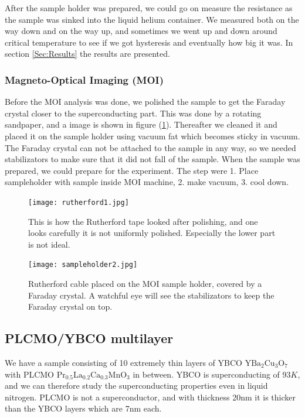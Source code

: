 \documentclass{comjnl}
\newcommand*\chem[1]{\ensuremath{\mathrm{#1}}}
\begin{document}
After the sample holder was prepared, we could go on measure the resistance as the sample was sinked into the liquid helium container. We measured both on the way down and on the way up, and sometimes we went up and down around critical temperature to see if we got hysteresis and eventually how big it was. In section \ref{Sec:Results} the results are presented.

\subsubsection{Magneto-Optical Imaging (MOI)}
Before the MOI analysis was done, we polished the sample to get the Faraday crystal closer to the superconducting part. This was done by a rotating sandpaper, and a image is shown in figure (\ref{fig:rutherford1}). Thereafter we cleaned it and placed it on the sample holder using vacuum fat which becomes sticky in vacuum. The Faraday crystal can not be attached to the sample in any way, so we needed stabilizators to make sure that it did not fall of the sample. When the sample was prepared, we could prepare for the experiment. The step were 1. Place sampleholder with sample inside MOI machine, 2. make vacuum, 3. cool down. 
\begin{figure}[h]
\centering
\texttt{[image: rutherford1.jpg]}
\caption{This is how the Rutherford tape looked after polishing, and one looks carefully it is not uniformly polished. Especially the lower part is not ideal. \label{fig:rutherford1}}
\end{figure}
\begin{figure}[h]
\centering
\texttt{[image: sampleholder2.jpg]}
\caption{Rutherford cable placed on the MOI sample holder, covered by a Faraday crystal. A watchful eye will see the stabilizators to keep the Faraday crystal on top. \label{fig:sampleholder2}}
\end{figure}

\subsection{PLCMO/YBCO multilayer}
We have a sample consisting of 10 extremely thin layers of YBCO \chem{YBa_2Cu_3O_7} with PLCMO \chem{Pr_{0.5}La_{0.2}Ca_{0.3}MnO_3} in between. YBCO is superconducting of $93K$, and we can therefore study the superconducting properties even in liquid nitrogen. PLCMO is not a superconductor, and with thickness 20nm it is thicker than the YBCO layers which are 7nm each. 
\end{document}
